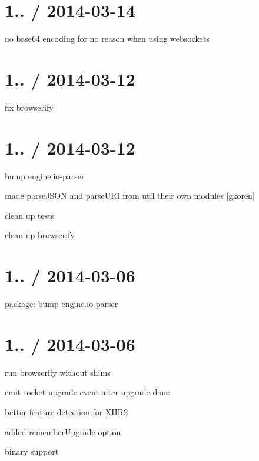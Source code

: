 \section*{1.. / 2014-\/03-\/14 }


\begin{DoxyItemize}
\item no base64 encoding for no reason when using websockets
\end{DoxyItemize}

\section*{1.. / 2014-\/03-\/12 }


\begin{DoxyItemize}
\item fix browserify
\end{DoxyItemize}

\section*{1.. / 2014-\/03-\/12 }


\begin{DoxyItemize}
\item bump {\ttfamily engine.\+io-\/parser}
\item made {\ttfamily parse\+J\+S\+ON} and {\ttfamily parse\+U\+RI} from {\ttfamily util} their own modules \mbox{[}gkoren\mbox{]}
\item clean up tests
\item clean up browserify
\end{DoxyItemize}

\section*{1.. / 2014-\/03-\/06 }


\begin{DoxyItemize}
\item package\+: bump {\ttfamily engine.\+io-\/parser}
\end{DoxyItemize}

\section*{1.. / 2014-\/03-\/06 }


\begin{DoxyItemize}
\item run browserify without shims
\item emit socket upgrade event after upgrade done
\item better feature detection for X\+H\+R2
\item added {\ttfamily remember\+Upgrade} option
\item binary support
\end{DoxyItemize}

